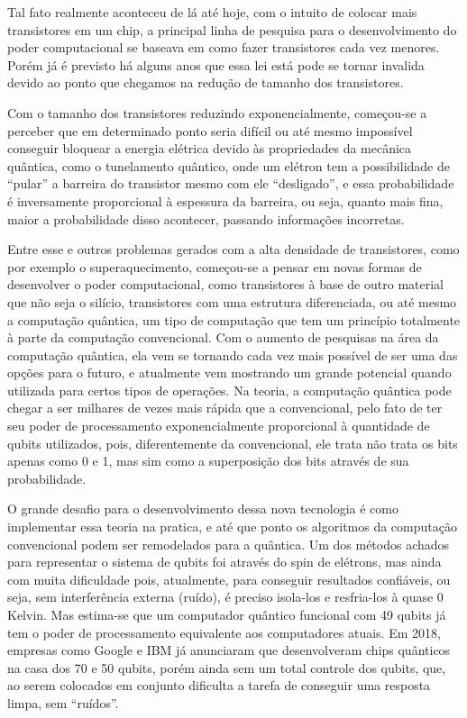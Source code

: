\documentclass[
	12pt,				%
	oneside,			%
	a4paper,			%
	english,			%
	french,				%
	spanish,			%
	brazil,				%
	]{abntex2}
\begin{document}
Tal fato realmente aconteceu de lá até hoje, com o intuito de colocar mais transistores em um chip, a principal linha de pesquisa para o desenvolvimento do poder computacional se baseava em como fazer transistores cada vez menores. Porém já é previsto há alguns anos que essa lei está pode se tornar invalida devido ao ponto que chegamos na redução de tamanho dos transistores. 

Com o tamanho dos transistores reduzindo exponencialmente, começou-se a perceber que em determinado ponto seria difícil ou até mesmo impossível conseguir bloquear a energia elétrica devido às propriedades da mecânica quântica, como o tunelamento quântico, onde um elétron tem a possibilidade de “pular” a barreira do transistor mesmo com ele “desligado”, e essa probabilidade é inversamente proporcional à espessura da barreira, ou seja, quanto mais fina, maior a probabilidade disso acontecer, passando informações incorretas. 

Entre esse e outros problemas gerados com a alta densidade de transistores, como por exemplo o superaquecimento, começou-se a pensar em novas formas de desenvolver o poder computacional, como transistores à base de outro material que não seja o silício, transistores com uma estrutura diferenciada, ou até mesmo a computação quântica, um tipo de computação que tem um princípio totalmente à parte da computação convencional.
Com o aumento de pesquisas na área da computação quântica, ela vem se tornando cada vez mais possível de ser uma das opções para o futuro, e atualmente vem mostrando um grande potencial quando utilizada para certos tipos de operações.
Na teoria, a computação quântica pode chegar a ser milhares de vezes mais rápida que a convencional, pelo fato de ter seu poder de processamento exponencialmente proporcional à quantidade de qubits utilizados, pois, diferentemente da convencional, ele trata não trata os bits apenas como 0 e 1, mas sim como a superposição dos bits através de sua probabilidade. 

O grande desafio para o desenvolvimento dessa nova tecnologia é como implementar essa teoria na pratica, e até que ponto os algoritmos da computação convencional podem ser remodelados para a quântica. Um dos métodos achados para representar o sistema de qubits foi através do spin de elétrons, mas ainda com muita dificuldade pois, atualmente, para conseguir resultados confiáveis, ou seja, sem interferência externa (ruído), é preciso isola-los e resfria-los à quase 0 Kelvin. Mas estima-se que um computador quântico funcional com 49 qubits já tem o poder de processamento equivalente aos computadores atuais. Em 2018, empresas como Google e IBM já anunciaram que desenvolveram chips quânticos na casa dos 70 e 50 qubits, porém ainda sem um total controle dos qubits, que, ao serem colocados em conjunto dificulta a tarefa de conseguir uma resposta limpa, sem “ruídos”. 
\end{document}
